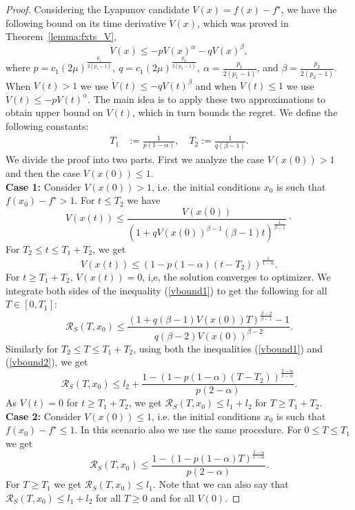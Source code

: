 \documentclass[letterpaper]{article}
\begin{document}
\begin{proof}
Considering the Lyapunov candidate $V(x)=f(x)-f^\star$, we have the following bound on its time derivative $\dot{V}(x)$, which was proved in Theorem~\ref{lemma:fxts_V}, \begin{equation}
\dot{V}(x) \leq -pV(x)^{\alpha} -qV(x)^{\beta},
\end{equation}
where $p=c_1(2\mu)^{\frac{p_1}{2(p_1 -1)}},\: q=c_1(2\mu)^{\frac{p_2}{2(p_2 -1)}},\: \alpha= \frac{p_1}{2(p_1 -1)}$, and $\beta= \frac{p_2}{2(p_2 -1)}$.
When $V(t)> 1$ we use $\dot{V}(t)\leq -qV(t)^{\beta}$ and when $V(t)\leq 1$ we use $\dot{V}(t)\leq -pV(t)^{\alpha}$. The main idea is to apply these two approximations to obtain upper bound on $V(t)$, which in turn bounds the regret. We define the following constants:
\begin{align*}
T_1 &:= \frac{1}{p(1-\alpha)}, \quad T_2:= \frac{1}{q(\beta-1)}.
\end{align*}
We divide the proof into two parts. First we analyze the case $V(x(0))>1$ and then the case $V(x(0))\leq 1$. \\
\textbf{Case 1:} Consider $V(x(0))>1$, i.e. the initial conditions $x_0$ is such that $f(x_0)-f^\star>1$. For $t\leq T_2$ we have 
\begin{equation} \label{vbound1}
V(x(t))\leq \frac{V(x(0))}{\left( 1+qV(x(0))^{\beta-1}(\beta-1)t\right)^{\frac{1}{\beta-1}}}\cdot
\end{equation}
For $T_2 \leq t\leq T_1+T_2$, we get
\begin{equation} \label{vbound2}
V(x(t))\leq \left(1-p(1-\alpha)(t-T_2)\right)^{\frac{1}{1-\alpha}}.
\end{equation}
For $t\geq T_1+T_2$, $V(x(t))=0$, i,e, the solution converges to optimizer. We integrate both sides of the inequality (\ref{vbound1}) to get the following for all $T\in[0,T_1]$:
\begin{equation*}
\mathcal{R}_S(T,x_0)\leq \frac{(1+q(\beta-1)V(x(0))T)^{\frac{\beta-2}{\beta-1}}-1}{q(\beta-2)V(x(0))^{\beta-2}}.
\end{equation*}
Similarly for $T_2\leq T\leq T_1+T_2$, using both the inequalities (\ref{vbound1}) and (\ref{vbound2}), we get
\begin{equation*}
\mathcal{R}_S(T,x_0)\leq l_2 + \frac{1-\left(1-p(1-\alpha)(T-T_2) \right)^{\frac{2-\alpha}{1-\alpha}}}{p(2-\alpha)} .
\end{equation*}
As $V(t)=0$ for $t\geq T_1+T_2$, we get $\mathcal{R}_S(T,x_0)\leq l_1+l_2$ for $T\geq T_1+T_2$. \\
\textbf{Case 2:} Consider $V(x(0))\leq1$, i.e. the initial conditions $x_0$ is such that $f(x_0)-f^\star\leq1$. In this scenario also we use the same procedure. For $0\leq T\leq T_1$ we get
\begin{equation*}
\mathcal{R}_S(T,x_0)\leq  \frac{1-\left(1-p(1-\alpha)T \right)^{\frac{2-\alpha}{1-\alpha}}}{p(2-\alpha)} .
\end{equation*}
For $T\geq T_1$ we get $\mathcal{R}_S (T,x_0) \leq l_1$. Note that we can also say that $\mathcal{R}_S(T,x_0)\leq l_1+l_2$ for all $T\geq0$ and for all $V(0)$.
\end{proof}
\end{document}
